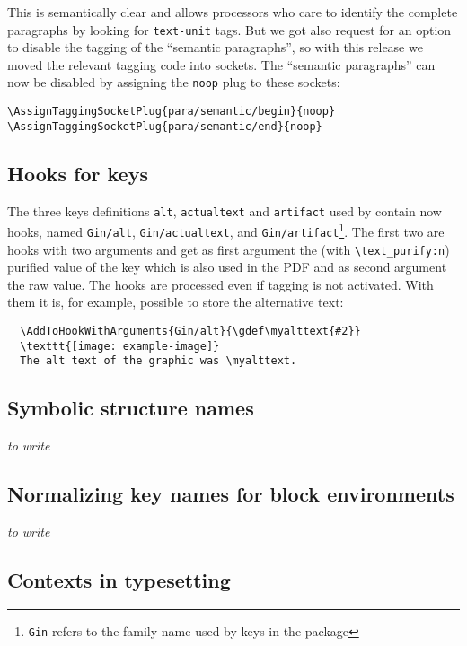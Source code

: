\documentclass{ltnews}
\begin{document}
This is semantically clear and allows processors who care to identify
the complete paragraphs by looking for \texttt{text-unit} tags. 
But we got also request for an option to disable the tagging of the 
\enquote{semantic paragraphs}, so with this release we moved the relevant tagging 
code into sockets. The \enquote{semantic paragraphs} can now be disabled by 
assigning the \texttt{noop} plug to these sockets:
\begin{verbatim}
\AssignTaggingSocketPlug{para/semantic/begin}{noop}
\AssignTaggingSocketPlug{para/semantic/end}{noop}
\end{verbatim}

\subsection{Hooks for  keys}
The three keys definitions \texttt{alt}, \texttt{actualtext} and 
\texttt{artifact} used by  contain now hooks, 
named \texttt{Gin/alt}, \texttt{Gin/actualtext}, and \texttt{Gin/artifact}\footnote{\texttt{Gin} refers to the family name used by
keys in the  package}. 
The first two are hooks with two arguments and get as first argument 
the (with \verb+\text_purify:n+) purified value of the key which is also used in the PDF 
and as second argument the raw value. 
The hooks are processed even if tagging is not activated.
With them it is, for example, possible to store the alternative text:
\begin{verbatim}
  \AddToHookWithArguments{Gin/alt}{\gdef\myalttext{#2}}
  \texttt{[image: example-image]}
  The alt text of the graphic was \myalttext.
\end{verbatim}


\subsection{Symbolic structure names}

\emph{to write}


\subsection{Normalizing key names for block environments}

\emph{to write}


\subsection{Contexts in typesetting}
\end{document}
